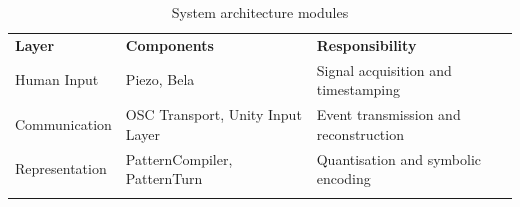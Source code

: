 \begin{longtable}[]{@{}
  >{\raggedright\arraybackslash}p{}
  >{\raggedright\arraybackslash}p{}
  >{\raggedright\arraybackslash}p{}@{}}
\caption{System architecture modules}\label{tab:system-architecture-modules}\\
\toprule\noalign{}
\begin{minipage}[b]{\linewidth}\centering
\textbf{Layer}
\end{minipage} & \begin{minipage}[b]{\linewidth}\centering
\textbf{Components}
\end{minipage} & \begin{minipage}[b]{\linewidth}\centering
\textbf{Responsibility}
\end{minipage} \\
\begin{minipage}[b]{\linewidth}\raggedright
Human Input
\end{minipage} & \begin{minipage}[b]{\linewidth}\raggedright
Piezo, Bela
\end{minipage} & \begin{minipage}[b]{\linewidth}\raggedright
Signal acquisition and timestamping
\end{minipage} \\
\begin{minipage}[b]{\linewidth}\raggedright
Communication
\end{minipage} & \begin{minipage}[b]{\linewidth}\raggedright
OSC Transport, Unity Input Layer
\end{minipage} & \begin{minipage}[b]{\linewidth}\raggedright
Event transmission and reconstruction
\end{minipage} \\
\begin{minipage}[b]{\linewidth}\raggedright
Representation
\end{minipage} & \begin{minipage}[b]{\linewidth}\raggedright
PatternCompiler, PatternTurn
\end{minipage} & \begin{minipage}[b]{\linewidth}\raggedright
Quantisation and symbolic encoding
\end{minipage} \\
\begin{minipage}[b]{\linewidth}\raggedright

\end{minipage}
\end{longtable}
